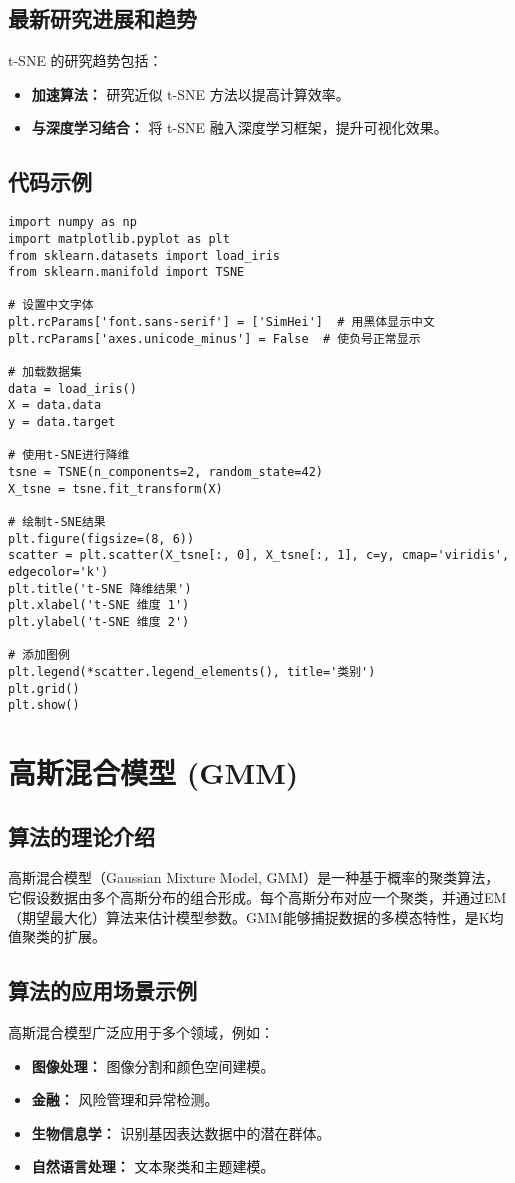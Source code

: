 \subsection*{最新研究进展和趋势}
t-SNE 的研究趋势包括：
\begin{itemize}
    \item \textbf{加速算法：} 研究近似 t-SNE 方法以提高计算效率。
    \item \textbf{与深度学习结合：} 将 t-SNE 融入深度学习框架，提升可视化效果。
\end{itemize}
\subsection*{代码示例}
\begin{lstlisting}
import numpy as np
import matplotlib.pyplot as plt
from sklearn.datasets import load_iris
from sklearn.manifold import TSNE

# 设置中文字体
plt.rcParams['font.sans-serif'] = ['SimHei']  # 用黑体显示中文
plt.rcParams['axes.unicode_minus'] = False  # 使负号正常显示

# 加载数据集
data = load_iris()
X = data.data
y = data.target

# 使用t-SNE进行降维
tsne = TSNE(n_components=2, random_state=42)
X_tsne = tsne.fit_transform(X)

# 绘制t-SNE结果
plt.figure(figsize=(8, 6))
scatter = plt.scatter(X_tsne[:, 0], X_tsne[:, 1], c=y, cmap='viridis', edgecolor='k')
plt.title('t-SNE 降维结果')
plt.xlabel('t-SNE 维度 1')
plt.ylabel('t-SNE 维度 2')

# 添加图例
plt.legend(*scatter.legend_elements(), title='类别')
plt.grid()
plt.show()

\end{lstlisting}


\section{高斯混合模型 (GMM)}
\subsection*{算法的理论介绍}
高斯混合模型（Gaussian Mixture Model, GMM）是一种基于概率的聚类算法，它假设数据由多个高斯分布的组合形成。每个高斯分布对应一个聚类，并通过EM（期望最大化）算法来估计模型参数。GMM能够捕捉数据的多模态特性，是K均值聚类的扩展。

\subsection*{算法的应用场景示例}
高斯混合模型广泛应用于多个领域，例如：
\begin{itemize}
    \item \textbf{图像处理：} 图像分割和颜色空间建模。
    \item \textbf{金融：} 风险管理和异常检测。
    \item \textbf{生物信息学：} 识别基因表达数据中的潜在群体。
    \item \textbf{自然语言处理：} 文本聚类和主题建模。
\end{itemize}


